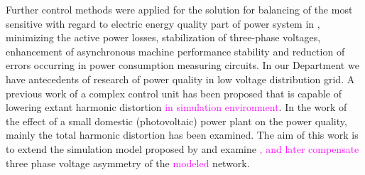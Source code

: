 Further control methods were applied for the solution for balancing of the most sensitive with regard to electric energy quality part of power system in \cite{uimethod},  minimizing the active power losses, stabilization of three-phase voltages, enhancement of asynchronous machine performance stability and reduction of errors occurring in power consumption measuring circuits. In our Department we have antecedents of research of power quality in low voltage distribution grid. A previous work of \cite{gorbe2012reduction} a complex control unit has been proposed that is capable of lowering extant harmonic distortion \textcolor{magenta}{in simulation environment}. In the work of \cite{Gorbe2014experimental} the effect of a small domestic (photovoltaic) power plant on the power quality, mainly the total harmonic distortion has been examined. The aim of this work is to extend the simulation model proposed by \cite{gorbe2012reduction} and examine \textcolor{magenta}{, and later compensate} three phase voltage asymmetry of the \textcolor{magenta}{modeled} network.
%
